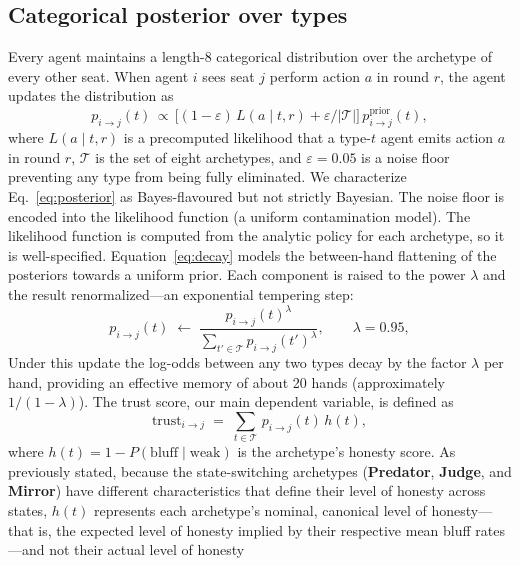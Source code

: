 \documentclass[10pt]{article} %
\newcommand{\arch}[1]{\textbf{#1}}
\begin{document}
\subsection{Categorical posterior over types}\label{sec:posterior}
Every agent maintains a length-8 categorical distribution over the
archetype of every other seat. When agent $i$ sees seat $j$ perform
action $a$ in round $r$, the agent updates the distribution as
\begin{equation}
  p_{i\to j}(t)\,\propto\,
    \bigl[(1-\varepsilon)\,L(a\mid t,r)
          + \varepsilon/|\mathcal{T}|\bigr]\,
    p_{i\to j}^{\text{prior}}(t),
  \label{eq:posterior}
\end{equation}
where $L(a\mid t, r)$ is a precomputed likelihood that a type-$t$
agent emits action $a$ in round $r$, $\mathcal{T}$ is the set of
eight archetypes, and $\varepsilon = 0.05$ is a noise floor
preventing any type from being fully eliminated. We characterize
Eq.~\ref{eq:posterior} as Bayes-flavoured but not strictly
Bayesian. The noise floor is encoded into the likelihood function
(a uniform contamination model). The likelihood function is computed
from the analytic policy for each archetype, so it is well-specified.
Equation~\ref{eq:decay} models the between-hand flattening of the
posteriors towards a uniform prior. Each component is raised to the
power $\lambda$ and the result renormalized---an exponential
tempering step:
\begin{equation}
  p_{i\to j}(t) \;\leftarrow\;
    \frac{p_{i\to j}(t)^{\lambda}}
         {\sum_{t'\in\mathcal{T}} p_{i\to j}(t')^{\lambda}},
  \qquad \lambda = 0.95,
  \label{eq:decay}
\end{equation}
Under this update the log-odds between any two types decay by the
factor $\lambda$ per hand, providing an effective memory of about 20
hands (approximately $1/(1-\lambda)$). The trust score, our main dependent variable, is
defined as
\begin{equation}
  \text{trust}_{i\to j} \;=\;
    \sum_{t\in\mathcal{T}}\, p_{i\to j}(t)\, h(t),
  \label{eq:trust}
\end{equation}
where $h(t) = 1 - P(\text{bluff}\mid\text{weak})$ is the
archetype's honesty
score. As previously stated, because the state-switching archetypes
(\arch{Predator}, \arch{Judge}, and \arch{Mirror}) have different
characteristics that define their level of honesty across states,
$h(t)$ represents each archetype's nominal, canonical level of
honesty---that is, the expected level of honesty implied by their
respective mean bluff rates---and not their actual level of honesty
\end{document}

